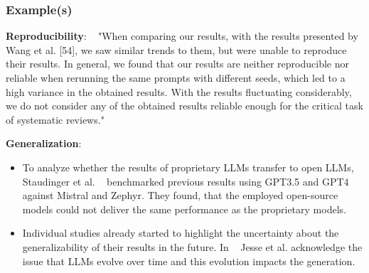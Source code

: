 \begin{itemize}
\subsubsection{Example(s)}
\textbf{Reproducibility}:
~\cite{DBLP:conf/sigir-ap/StaudingerKPLH24} "When comparing our results, with the results presented by Wang et al. [54], we saw similar trends to them, but were unable to reproduce their results. In general, we found that our results are neither reproducible nor reliable when rerunning the same prompts with different seeds, which led to a high variance in the obtained results. With the results fluctuating considerably, we do not consider any of the obtained results reliable enough for the critical task of systematic reviews."

\textbf{Generalization}:
\begin{itemize}
  \item To analyze whether the results of proprietary LLMs transfer to open LLMs, Staudinger et al. ~\cite{DBLP:conf/sigir-ap/StaudingerKPLH24} benchmarked previous results using GPT3.5 and GPT4 against Mistral and Zephyr. They found, that the employed open-source models could not deliver the same performance as the proprietary models.
  \item Individual studies already started to highlight the uncertainty about the generalizability of their results in the future. In ~\cite{DBLP:conf/msr/JesseADM23} Jesse et al. acknowledge the issue that LLMs evolve over time and this evolution impacts the generation.
\end{itemize}


\end{itemize}
